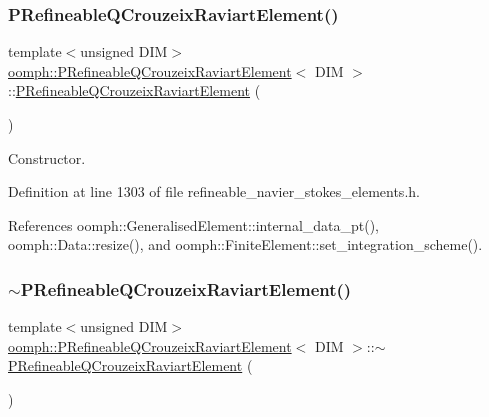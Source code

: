\subsubsection{\texorpdfstring{P\+Refineable\+Q\+Crouzeix\+Raviart\+Element()}{PRefineableQCrouzeixRaviartElement()}\hspace{0.1cm}{\footnotesize\ttfamily [1/2]}}
{\footnotesize\ttfamily template$<$unsigned D\+IM$>$ \\
\hyperlink{classoomph_1_1PRefineableQCrouzeixRaviartElement}{oomph\+::\+P\+Refineable\+Q\+Crouzeix\+Raviart\+Element}$<$ D\+IM $>$\+::\hyperlink{classoomph_1_1PRefineableQCrouzeixRaviartElement}{P\+Refineable\+Q\+Crouzeix\+Raviart\+Element} (\begin{DoxyParamCaption}{ }\end{DoxyParamCaption})\hspace{0.3cm}{\ttfamily [inline]}}



Constructor. 



Definition at line 1303 of file refineable\+\_\+navier\+\_\+stokes\+\_\+elements.\+h.



References oomph\+::\+Generalised\+Element\+::internal\+\_\+data\+\_\+pt(), oomph\+::\+Data\+::resize(), and oomph\+::\+Finite\+Element\+::set\+\_\+integration\+\_\+scheme().

\mbox{\label{classoomph_1_1PRefineableQCrouzeixRaviartElement_a1cf44559e861aa992849c7466d2123e2}} 
\subsubsection{\texorpdfstring{$\sim$\+P\+Refineable\+Q\+Crouzeix\+Raviart\+Element()}{~PRefineableQCrouzeixRaviartElement()}}
{\footnotesize\ttfamily template$<$unsigned D\+IM$>$ \\
\hyperlink{classoomph_1_1PRefineableQCrouzeixRaviartElement}{oomph\+::\+P\+Refineable\+Q\+Crouzeix\+Raviart\+Element}$<$ D\+IM $>$\+::$\sim$\hyperlink{classoomph_1_1PRefineableQCrouzeixRaviartElement}{P\+Refineable\+Q\+Crouzeix\+Raviart\+Element} (\begin{DoxyParamCaption}{ }\end{DoxyParamCaption})\hspace{0.3cm}{\ttfamily [inline]}}



